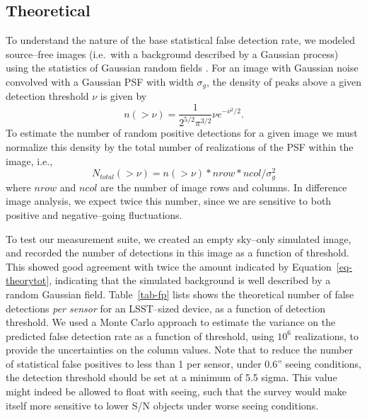 \documentclass[floatfix, apj]{emulateapj}
\begin{document}
\subsection{Theoretical \label{sec-analyticfp}}

To understand the nature of the base statistical false detection rate, we modeled source--free images (i.e.\ with a background described by a Gaussian process) using the statistics of Gaussian random fields \citep{Kaiser-PointSources}.
For an image with Gaussian noise convolved with a Gaussian PSF with width $\sigma_g$, the density of peaks above a given detection threshold $\nu$ is given by
\begin{equation}
n(>\nu) = \frac{1}{2^{5/2}\pi^{3/2}} \nu e^{-\nu^2 /2}.
\label{eq-theory}
\end{equation}
To estimate the number of random positive detections for a given image we must normalize this density by the total number of realizations of the PSF within the image, i.e.,
\begin{equation}
N_{total}(>\nu) = n(>\nu)*nrow*ncol/ \sigma_g^2
\label{eq-theorytot}
\end{equation}
where $nrow$ and $ncol$ are the number of image rows and columns.
In difference image analysis, we expect twice this number, since we are sensitive to both positive and negative--going fluctuations.

To test our measurement suite, we created an empty sky--only simulated image, and recorded the number of detections in this image as a function of threshold.
This showed good agreement with twice the amount indicated by Equation~\ref{eq-theorytot}, indicating that the simulated background is well described by a random Gaussian field.
Table~\ref{tab-fp} lists shows the theoretical number of false detections {\it per sensor} for an LSST--sized device, as a function of detection threshold.
We used a Monte Carlo approach to estimate the variance on the predicted false detection rate as a function of threshold, using $10^6$ realizations, to provide the uncertainties on the column values.
Note that to reduce the number of statistical false positives to less than 1 per sensor, under 0.6'' seeing conditions, the detection threshold should be set at a minimum of 5.5 sigma.
This value might indeed be allowed to float with seeing, such that the survey would make itself more sensitive to lower S/N objects under worse seeing conditions.
\end{document}
